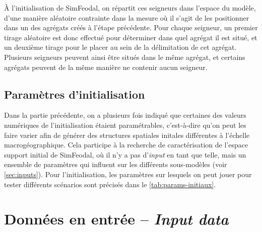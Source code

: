 À l'initialisation de SimFeodal, on répartit ces seigneurs dans l'espace du modèle, d'une manière aléatoire contrainte dans la mesure où il s'agit de les positionner dans un des agrégats créés à l'étape précédente.
Pour chaque seigneur, un premier tirage aléatoire est donc effectué pour déterminer dans quel agrégat il est situé, et un deuxième tirage pour le placer au sein de la délimitation de cet agrégat.
Plusieurs seigneurs peuvent ainsi être situés dans le même agrégat, et certains agrégats peuvent de la même manière ne contenir aucun seigneur.


\subsection{Paramètres d'initialisation}

Dans la partie précédente, on a plusieurs fois indiqué que certaines des valeurs numériques de l'initialisation étaient paramétrables, c'est-à-dire qu'on peut les faire varier afin de générer des structures spatiales initales différentes à l'échelle macrogéographique.
Cela participe à la recherche de caractérisation de l'espace support initial de SimFeodal, où il n'y a pas d'\og \textit{input}\fg{} en tant que telle, mais un ensemble de paramètres qui influent sur les différents sous-modèles (voir \cref{sec:inputs}).
Pour l'initialisation, les paramètres sur lesquels on peut jouer pour tester différents scénarios sont précisés dans le \cref{tab:params-initiaux}.




\let\orisectionmark\sectionmark
\renewcommand\sectionmark[1]{}%
\section[Données en entrée -- \textit{Input data}]{Données en entrée -- \large{\textit{Input data}} \label{sec:inputs}}
\orisectionmark{Données en entrée}
\let\sectionmark\orisectionmark

